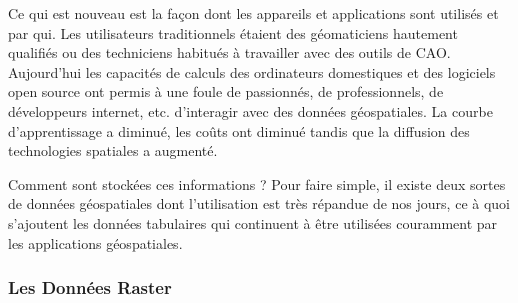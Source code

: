 Ce qui est nouveau est la façon dont les appareils et applications sont utilisés et par qui. Les utilisateurs traditionnels étaient des géomaticiens hautement qualifiés ou des techniciens habitués à travailler avec des outils de CAO. Aujourd'hui les capacités de calculs des ordinateurs domestiques et des logiciels open source ont permis à une foule de passionnés, de professionnels, de développeurs internet, etc. d'interagir avec des données géospatiales. La courbe d'apprentissage a diminué, les coûts ont diminué tandis que la diffusion des technologies spatiales a augmenté.

Comment sont stockées ces informations ? Pour faire simple, il existe deux sortes de données géospatiales dont l'utilisation est très répandue de nos jours, ce à quoi s'ajoutent les données tabulaires qui continuent à être utilisées couramment par les applications géospatiales.

%
%
%

\subsubsection{Les Données Raster}\label{label_rasterdata}


